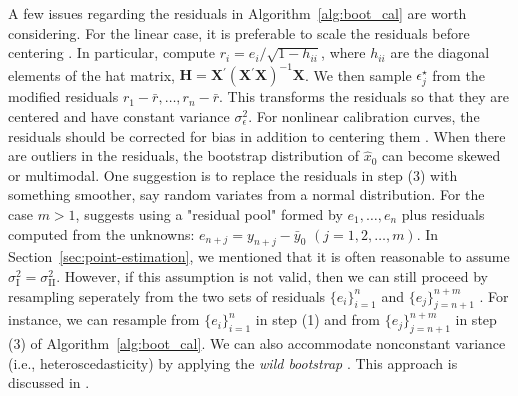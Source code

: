 \documentclass[cmfont,usenames,dvipsnames,leqno]{afit-etd}\usepackage[]{graphicx}\usepackage[]{color}
\newcommand{\boot}{\star} %
\newcommand{\trans}{\ensuremath{^\prime}}
\newcommand{\wh}[1]{\ensuremath{\widehat{#1}}}
\newcommand{\X}{\ensuremath{\bm{X}}}
\begin{document}
A few issues regarding the residuals in Algorithm~\ref{alg:boot_cal} are worth considering. For the linear case, it is preferable to scale the residuals before centering \citep{davison_bootstrap_1997}. In particular, compute $r_i = e_i/\sqrt{1-h_{ii}}$, where $h_{ii}$ are the diagonal elements of the hat matrix, $\bm{H} = \X\trans(\X\trans\X)^{-1}\X$. We then sample $\epsilon_j^\boot$ from the modified residuals $r_1 - \bar{r}, \dotsc, r_n - \bar{r}$. This transforms the residuals so that they are centered and have constant variance $\sigma_\epsilon^2$. For nonlinear calibration curves, the residuals should be corrected for bias in addition to centering them \citep{davison_bootstrap_1997}. When there are outliers in the residuals, the bootstrap distribution of $\wh{x}_0$ can become skewed or multimodal. One suggestion is to replace the residuals in step (3) with something smoother, say random variates from a normal distribution. For the case $m > 1$, \citet{jones_bootstrapping_1999} suggests using a "residual pool" formed by $e_1, \dotsc, e_n$ plus residuals computed from the unknowns: $e_{n+j} = y_{n+j} - \bar{y}_0$ $(j = 1, 2, \dotsc, m)$. In Section~\ref{sec:point-estimation}, we mentioned that it is often reasonable to assume $\sigma_{\text{I}}^2 = \sigma_{\text{II}}^2$. However, if this assumption is not valid, then we can still proceed by resampling seperately from the two sets of residuals $\big\{e_i\big\}_{i = 1}^n$ and $\big\{e_j\big\}_{j = n + 1}^{n + m}$ \citep{gruet_calibration_1993, jones_bootstrapping_1999}. For instance, we can resample from $\big\{e_i\big\}_{i = 1}^n$ in step (1) and from $\big\{e_j\big\}_{j = n + 1}^{n + m}$ in step (3) of Algorithm~\ref{alg:boot_cal}. We can also accommodate nonconstant variance (i.e., heteroscedasticity) by applying the \textit{wild bootstrap} \citep[pp. 272]{davison_bootstrap_1997}. This approach is discussed in \citet[pp. 142]{huet_statistical_2004}.
\end{document}
